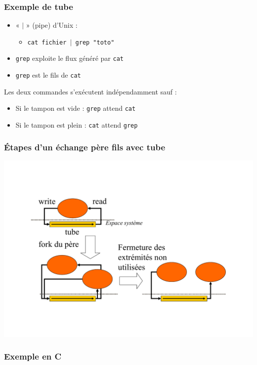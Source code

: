 \begin{frame}
\frametitle{Exemple de tube}
\begin{itemize}
\item « $\mid$ » (pipe) d’Unix :
\begin{itemize}
\item \texttt{cat fichier $\mid$ grep "toto"}
\end{itemize}
\item \texttt{grep} exploite le flux généré par \texttt{cat}
\item \texttt{grep} est le fils de \texttt{cat}
\end{itemize}
Les deux commandes s’exécutent indépendamment sauf :
\begin{itemize}
\item Si le tampon est vide : \texttt{grep} attend \texttt{cat}
\item Si le tampon est plein : \texttt{cat} attend \texttt{grep}
\end{itemize}
\end{frame}

\begin{frame}
\frametitle{Étapes d’un échange père fils avec tube}
\includegraphics[width=.9\textwidth]{../illustration/tube_fork.pdf}
\end{frame}

\begin{frame}
\frametitle{Exemple en C}
\begin{scriptsize}\end{scriptsize}
\end{frame}

